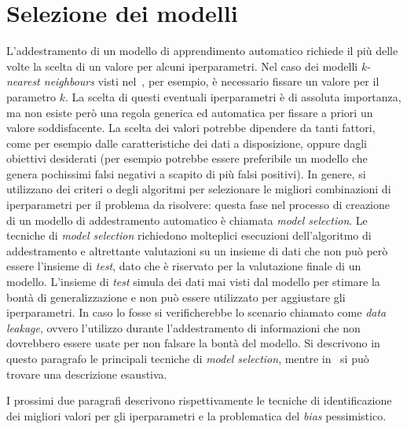 \section{Selezione dei modelli}\label{sec:model_selection}
L'addestramento di un modello di apprendimento automatico richiede il più delle volte la scelta di un valore per alcuni iperparametri. 
Nel caso dei modelli \emph{k-nearest neighbours} visti nel~, per esempio, è necessario fissare un valore per il parametro $k$. 
La scelta di questi eventuali iperparametri è di assoluta importanza, ma non esiste però una regola generica ed automatica per fissare a priori un valore soddisfacente. La scelta dei valori potrebbe dipendere da tanti fattori, come per esempio dalle caratteristiche dei dati a disposizione, oppure dagli obiettivi desiderati (per esempio potrebbe essere preferibile un modello che genera pochissimi falsi negativi a scapito di più falsi positivi).
In genere, si utilizzano dei criteri o degli algoritmi per selezionare le migliori combinazioni di iperparametri per il problema da risolvere: questa fase nel processo di creazione di un modello di addestramento automatico è chiamata \emph{model selection}.
Le tecniche di \emph{model selection} richiedono molteplici esecuzioni dell'algoritmo di addestramento e altrettante valutazioni su un insieme di dati che non può però essere l'insieme di \emph{test}, dato che è riservato per la valutazione finale di un modello. 
L'insieme di \emph{test} simula dei dati mai visti dal modello per stimare la bontà di generalizzazione e non può essere utilizzato per aggiustare gli iperparametri.
In caso lo fosse si verificherebbe lo scenario chiamato come \emph{data leakage}, ovvero l'utilizzo durante l'addestramento di informazioni che non dovrebbero essere usate per non falsare la bontà del modello.
Si descrivono in questo paragrafo le principali tecniche di \emph{model selection}, mentre in~\cite{model_evaluation} si può trovare una descrizione esaustiva.

I prossimi due paragrafi descrivono rispettivamente le tecniche di identificazione dei migliori valori per gli iperparametri e la problematica del \emph{bias} pessimistico.

